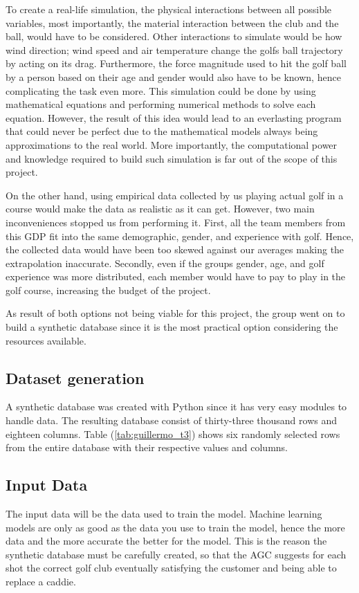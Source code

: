 \documentclass[11pt,landscape]{article}
\begin{document}
\begin{multicols}{3}
To create a real-life simulation, the physical interactions between all possible
variables, most importantly, the material interaction between the club and the
ball, would have to be considered. Other interactions to simulate would be how
wind direction; wind speed and air temperature change the golfs ball trajectory
by acting on its drag. Furthermore, the force magnitude used to hit the golf
ball by a person based on their age and gender would also have to be known,
hence complicating the task even more. This simulation could be done by using
mathematical equations and performing numerical methods to solve each equation.
However, the result of this idea would lead to an everlasting program that could
never be perfect due to the mathematical models always being approximations to
the real world. More importantly, the computational power and knowledge required
to build such simulation is far out of the scope of this project. 

On the other hand, using empirical data collected by us playing actual golf in a
course would make the data as realistic as it can get. However, two main
inconveniences stopped us from performing it. First, all the team members from
this GDP fit into the same demographic, gender, and experience with golf. Hence,
the collected data would have been too skewed against our averages making the
extrapolation inaccurate. Secondly, even if the groups gender, age, and golf
experience was more distributed, each member would have to pay to play in the
golf course, increasing the budget of the project.

As result of both options not being viable for this project, the group went on
to build a synthetic database since it is the most practical option considering
the resources available.

\subsection{Dataset generation}
A synthetic database was created with Python since it has very easy modules to
handle data. The resulting database consist of thirty-three thousand rows and
eighteen columns. Table (\ref{tab:guillermo_t3}) shows six randomly selected rows from the entire
database with their respective values and columns.

\subsection{Input Data}
The input data will be the data used to train the model. Machine learning models
are only as good as the data you use to train the model, hence the more data and
the more accurate the better for the model. This is the reason the synthetic
database must be carefully created, so that the AGC suggests for each shot the
correct golf club eventually satisfying the customer and being able to replace a
caddie.


\end{multicols}
\end{document}
